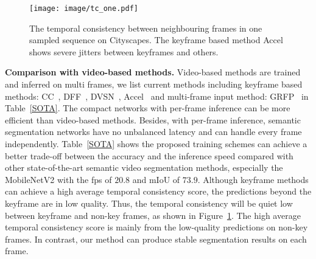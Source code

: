 \documentclass[runningheads]{llncs}
\begin{document}
\begin{figure}[t]
    \centering
    \texttt{[image: image/tc\_one.pdf]}
    \caption{The temporal consistency between neighbouring frames in one sampled sequence on Cityscapes. The keyframe based method Accel
    shows
    severe jitters between keyframes and others.}
    \label{fig:tc_one}

\end{figure}{}

\noindent\textbf{Comparison with video-based methods.}
Video-based methods are trained and inferred on multi frames, we list current methods including keyframe based methods: CC~\cite{shelhamer2016clockwork}, DFF~\cite{zhu2017deep}, DVSN~\cite{xu2018dynamic}, Accel~\cite{jain2019accel}  and multi-frame input method: GRFP~\cite{nilsson2018semantic} in Table~\ref{SOTA}. The compact networks with per-frame inference can be more efficient than video-based methods. Besides, with per-frame inference, semantic segmentation networks have no unbalanced latency and can handle every frame independently.
Table~\ref{SOTA} shows the proposed training schemes can achieve a better trade-off between the accuracy and the inference speed compared with other state-of-the-art semantic video segmentation methods, especially the MobileNetV2 with the fps of $20.8$ and mIoU of $73.9$. Although keyframe methods can achieve a high average temporal consistency score, the predictions beyond the keyframe are in low quality. Thus, the temporal consistency will be quiet low between keyframe and non-key frames, as shown in Figure~\ref{fig:tc_one}. The high average temporal consistency score is mainly from the low-quality predictions on non-key frames. In contrast, our method can produce stable segmentation results on each frame.
\end{document}

